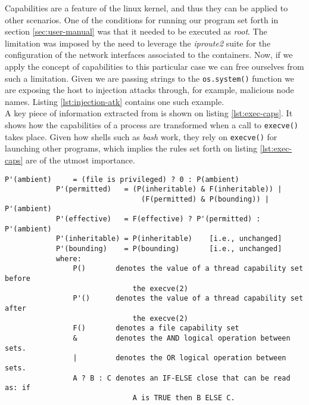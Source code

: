         Capabilities are a feature of the linux kernel, and thus they can be applied to other scenarios. One of the conditions for running our program set forth in section \ref{sec:user-manual} was that it needed to be executed as \textit{root}. The limitation was imposed by the need to leverage the \textit{iproute2} suite for the configuration of the network interfaces associated to the containers. Now, if we apply the concept of capabilities to this particular case we can free ourselves from such a limitation. Given we are passing strings to the \texttt{os.system()} function we are exposing the host to injection attacks through, for example, malicious node names. Listing \ref{lst:injection-atk} contains one such example.\\

        A key piece of information extracted from \cite{bib:man-capabilities} is shown on listing \ref{lst:exec-caps}. It shows how the capabilities of a process are transformed when a call to \texttt{execve()} \cite{bib:man-execve} takes place. Given how shells such as \textit{bash} \cite{bib:man-bash} work, they rely on \texttt{execve()} for launching other programs, which implies the rules set forth on listing \ref{lst:exec-caps} are of the utmost importance.\\

        \begin{lstlisting}[language = {}, caption = Transformation of Capabilities During \texttt{execve()}., label = lst:exec-caps]
            P'(ambient)     = (file is privileged) ? 0 : P(ambient)
            P'(permitted)   = (P(inheritable) & F(inheritable)) |
                                (F(permitted) & P(bounding)) | P'(ambient)
            P'(effective)   = F(effective) ? P'(permitted) : P'(ambient)
            P'(inheritable) = P(inheritable)    [i.e., unchanged]
            P'(bounding)    = P(bounding)       [i.e., unchanged]
            where:
                P()       denotes the value of a thread capability set before
                              the execve(2)
                P'()      denotes the value of a thread capability set after
                              the execve(2)
                F()       denotes a file capability set
                &         denotes the AND logical operation between sets.
                |         denotes the OR logical operation between sets.
                A ? B : C denotes an IF-ELSE close that can be read as: if
                              A is TRUE then B ELSE C.
        \end{lstlisting}

